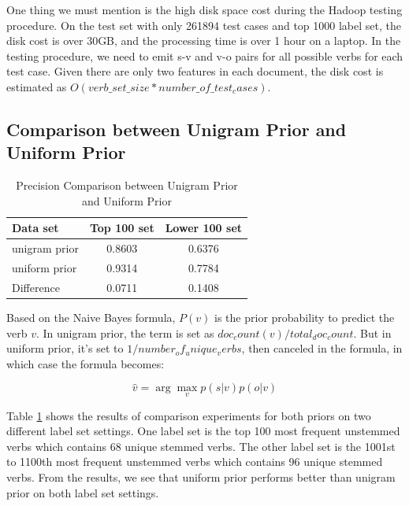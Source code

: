 One thing we must mention is the high disk space cost during the Hadoop testing procedure. On the test set with only 261894 test cases and top 1000 label set, the disk cost is over 30GB, and the processing time is over 1 hour on a laptop. In the testing procedure, we need to emit s-v and v-o pairs for all possible verbs for each test case. Given there are only two features in each document, the disk cost is estimated as $O(verb\_set\_size * number\_of\_test_cases)$. 

\subsection{Comparison between Unigram Prior and Uniform Prior}

\begin{table}[t]
\caption{Precision Comparison between Unigram Prior and Uniform Prior}
\label{tab-prior-comparison}
\vskip 0.15in
\begin{center}
\begin{small}
\begin{sc}
\begin{tabular}{l|cc}
\hline
\abovespace \belowspace
Data set & Top 100 set & Lower 100 set \\
\hline
\abovespace
unigram prior & 0.8603 & 0.6376 \\
\belowspace
uniform prior & 0.9314 & 0.7784 \\
\hline
\abovespace
\belowspace
Difference & 0.0711 & 0.1408 \\
\hline
\end{tabular}
\end{sc}
\end{small}
\end{center}
\vskip -0.1in
\end{table}

Based on the Naive Bayes formula, $P(v)$ is the prior probability to predict the verb $v$. In unigram prior, the term is set as $doc_count(v) / total_doc_count$. But in uniform prior, it's set to $1/number_of_unique_verbs$, then canceled in the formula, in which case the formula becomes:

\begin{equation}
	\hat{v} = \arg\max_v p(s|v)p(o|v)
\end{equation}

Table \ref{tab-prior-comparison} shows the results of comparison experiments for both priors on two different label set settings. One label set is the top 100 most frequent unstemmed verbs which contains 68 unique stemmed verbs. The other label set is the 1001st to 1100th most frequent unstemmed verbs which contains 96 unique stemmed verbs. From the results, we see that uniform prior performs better than unigram prior on both label set settings. 


